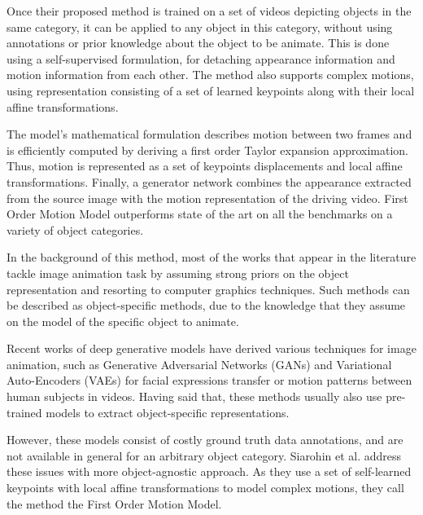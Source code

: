 \documentclass[english,12pt]{article}
\begin{document}
Once their proposed method is trained on a set of videos depicting objects in the same category, it can be
applied to any object in this category, without using annotations or prior knowledge about the object to be
animate.
This is done using a self-supervised formulation, for detaching appearance information and motion information
from each other. The method also supports complex motions, using representation consisting of a set of learned
keypoints along with their local affine transformations.

The model's mathematical formulation describes motion between two frames and is efficiently computed by
deriving a first order Taylor expansion approximation. Thus, motion is represented as a set of keypoints
displacements and local affine transformations.
Finally, a generator network combines the appearance extracted from the source image with the motion
representation of the driving video. First Order Motion Model outperforms state of the art on all the
benchmarks on a variety of object categories.

In the background of this method, most of the works that appear in the literature tackle image animation
task by assuming strong priors on the object representation and resorting to computer graphics techniques.
Such methods can be described as object-specific methods, due to the knowledge that they assume on the
model of the specific object to animate.

Recent works of deep generative models have derived various techniques for image animation, such as
Generative Adversarial Networks (GANs) and Variational Auto-Encoders (VAEs) for facial expressions
transfer or motion patterns between human subjects in videos. Having said that, these methods
usually also use pre-trained models to extract object-specific representations.

However, these models consist of costly ground truth data annotations, and are not available in general
for an arbitrary object category. Siarohin et al. address these issues with more object-agnostic approach.
As they use a set of self-learned keypoints with local affine transformations to model complex motions,
they call the method the First Order Motion Model.\\

\end{document}
